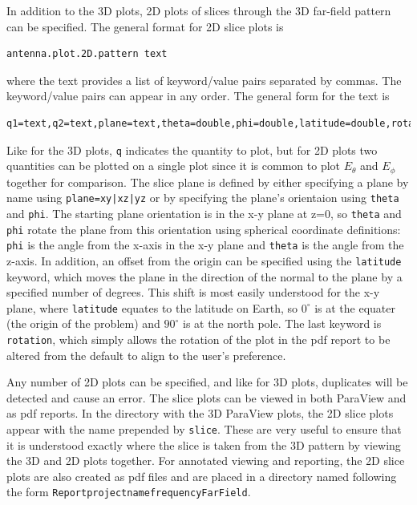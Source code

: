 \documentclass[titlepage]{article}
\renewcommand\_{\textunderscore\linebreak[1]}
\begin{document}
In addition to the 3D plots, 2D plots of slices through the 3D far-field pattern can be specified.  The general format for 2D slice plots is
\begin{Verbatim}[fontsize=\small]
  antenna.plot.2D.pattern text
\end{Verbatim}
\noindent where the text provides a list of keyword/value pairs separated by commas.  The keyword/value pairs can appear in any order. The general form for the text is
\begin{Verbatim}[fontsize=\small]
  q1=text,q2=text,plane=text,theta=double,phi=double,latitude=double,rotation=double
\end{Verbatim}
\noindent Like for the 3D plots, \texttt{q} indicates the quantity to plot, but for 2D plots two quantities can be plotted on a single plot since it is common to plot $E_\theta$ and $E_\phi$ together for comparison.  The slice plane is defined by either specifying a plane by name using \texttt{plane=xy|xz|yz} or by specifying the plane's orientaion using \texttt{theta} and \texttt{phi}.  The starting plane orientation is in the x-y plane at z=0, so \texttt{theta} and \texttt{phi} rotate the plane from this orientation using spherical coordinate definitions: \texttt{phi} is the angle from the x-axis in the x-y plane and \texttt{theta} is the angle from the z-axis.  In addition, an offset from the origin can be specified using the \texttt{latitude} keyword, which moves the plane in the direction of the normal to the plane by a specified number of degrees.  This shift is most easily understood for the x-y plane, where \texttt{latitude} equates to the latitude on Earth, so $0^\circ$ is at the equater (the origin of the problem) and $90^\circ$ is at the north pole.  The last keyword is \texttt{rotation}, which simply allows the rotation of the plot in the pdf report to be altered from the default to align to the user's preference.

Any number of 2D plots can be specified, and like for 3D plots, duplicates will be detected and cause an error.  The slice plots can be viewed in both ParaView and as pdf reports.  In the directory with the 3D ParaView plots, the 2D slice plots appear with the name prepended by \texttt{slice\_}.  These are very useful to ensure that it is understood exactly where the slice is taken from the 3D pattern by viewing the 3D and 2D plots together.  For annotated viewing and reporting, the 2D slice plots are also created as pdf files and are placed in a directory named following the form \texttt{Report\_projectname\_frequency\_FarField}.
\end{document}
